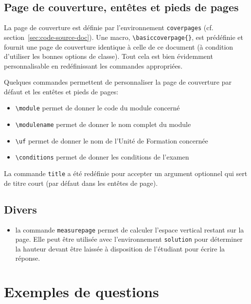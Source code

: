 \documentclass[addpoints,fr,biblatex,name,gradetable]{isae-exam}
\begin{document}
\subsection{Page de couverture, entêtes et pieds de pages}
\label{sec:page-de-couverture}

La page de couverture est définie par l'environnement
\lstinline!coverpages! (cf. section~\ref{sec:code-source-doc}). Une
macro, \lstinline!\basiccoverpage{}!, est prédéfinie et fournit une
page de couverture identique à celle de ce document (à condition
d'utiliser les bonnes options de classe). Tout cela est bien
évidemment personnalisable en redéfinissant les commandes appropriées.

Quelques commandes permettent de personnaliser la page de couverture
par défaut et les entêtes et pieds de pages:

\begin{itemize}
\item \lstinline!\module! permet de donner le code du module concerné
\item \lstinline!\modulename! permet de donner le nom complet du module
\item \lstinline!\uf! permet de donner le nom de l'Unité de Formation
  concernée
\item \lstinline!\conditions! permet de donner les conditions de
  l'examen
\end{itemize}

La commande \lstinline!title! a été redéfinie pour accepter un
argument optionnel qui sert de titre court (par défaut dans les
entêtes de page).

\subsection{Divers}
\label{sec:divers}

\begin{itemize}
\item la commande \lstinline!measurepage! permet de calculer l'espace
  vertical restant sur la page. Elle peut être utilisée avec
  l'environnement \lstinline!solution! pour déterminer la hauteur
  devant être laissée à disposition de l'étudiant pour écrire la
  réponse.
\end{itemize}

\section{Exemples de questions}
\label{sec:exemples-questions}
\end{document}
